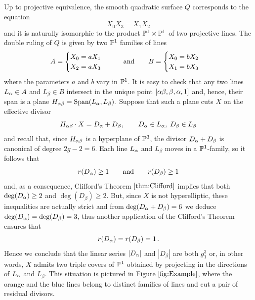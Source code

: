 \begin{example}
 		Up to projective equivalence, the smooth quadratic surface $Q$ corresponds to the equation
 		$$ X_0 X_3 = X_1 X_2 $$
 		and it is naturally isomorphic to the product $\mathbb{P}^1 \times \mathbb{P}^1$ of two projective lines. The double ruling of $Q$ is given by two $\mathbb{P}^1$ families of lines
 		$$ A= \begin{cases} X_0=a X_1 \\ X_2=a X_3 \end{cases} \qquad \text{and} \qquad B= \begin{cases} X_0=b X_2 \\ X_1=b X_3 \end{cases} $$
 		where the parameters $a$ and $b$ vary in $\mathbb{P}^1$. It is easy to check that any two lines $L_\alpha \in A$ and $L_\beta \in B$ intersect in the unique point $[{\alpha\beta}, \beta, \alpha, 1]$ and, hence, their span is a plane $H_{\alpha\beta} = \operatorname{Span}(L_\alpha, L_\beta)$. Suppose that such a plane cuts $X$ on the effective divisor
 		$$ H_{\alpha\beta} \cdot X = D_\alpha + D_\beta, \qquad D_\alpha\in L_\alpha, \; D_\beta\in L_\beta $$
 		and recall that, since $H_{\alpha\beta}$ is a hyperplane of $\mathbb{P}^3$, the divisor $D_\alpha + D_\beta$ is canonical of degree $2g-2=6$.
 		Each line $L_\alpha$ and $L_\beta$ moves in a $\mathbb{P}^1$-family, so it follows that
 		$$ r(D_\alpha) \geq 1 \qquad \text{and} \qquad r(D_\beta) \geq 1 $$
 		and, as a consequence, Clifford's Theorem $\ref{thm:Clifford}$ implies that both $\deg(D_\alpha)\geq 2$ and $\deg(D_\beta)\geq 2$. But, since $X$ is not hyperelliptic, these inequalities are actually strict and from $\deg(D_\alpha+D_\beta)=6$ we deduce
 		$ \deg(D_\alpha) = \deg(D_\beta) = 3 $,
 		thus another application of the Clifford's Theorem ensures that
 		$$ r(D_\alpha) = r(D_\beta) = 1\,. $$
 		Hence we conclude that the linear series $|D_\alpha|$ and $|D_\beta|$ are both $g_1^3$ or, in other words, $X$ admits two triple covers of $\mathbb{P}^1$ obtained by projecting in the directions of $L_\alpha$ and $L_\beta$. This situation is pictured in Figure $\ref{fig:Example}$, where the orange and the blue lines belong to distinct families of lines and cut a pair of residual divisors.
 	
 	\end{example}

